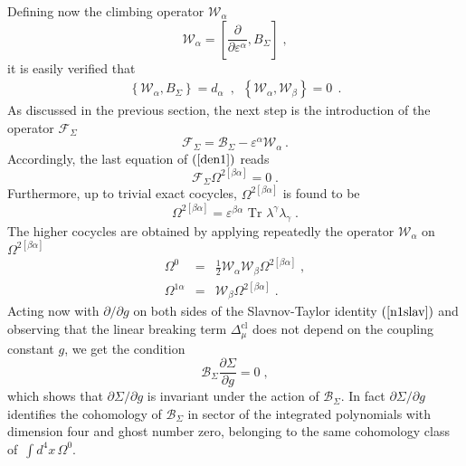 \documentclass[a4paper,12pt]{article}
\begin{document}
Defining now the climbing operator $\mathcal{W}_{\alpha }$ 
\begin{equation}
\mathcal{W}_{\alpha }=\left[ \frac{\partial }{\partial \varepsilon ^{\alpha }%
},B_{\Sigma }\right] \;,  \label{con1}
\end{equation}
it is easily verified that 
\begin{eqnarray}
\left\{ \mathcal{W}_{\alpha },B_{\Sigma }\right\} = d_{\alpha }\,\,\, ,
\,\,\, \left\{ \mathcal{W}_{\alpha },\mathcal{W}_{\beta }\right\} =0\,\;%
\mathrm{.}  \label{algn1}
\end{eqnarray}
As discussed in the previous section, the next step is the introduction of
the operator $\mathcal{F}_{\Sigma }\;$%
\begin{equation}
\mathcal{F}_{\Sigma }=\mathcal{B}_{\Sigma }-\varepsilon ^{\alpha }\mathcal{W}%
_{\alpha \;}.  \label{nbn1}
\end{equation}
Accordingly, the last equation of $\left( \ref{den1}\right) $ reads 
\begin{equation}
\mathcal{F}_{\Sigma }\Omega ^{2[\beta \alpha ]}=0\;.  \label{le}
\end{equation}
Furthermore, up to trivial exact cocycles, $\Omega ^{2[\beta \alpha ]}$ is
found to be 
\begin{equation}
\Omega ^{2[\beta \alpha ]}=\varepsilon ^{\beta \alpha }\,\,\mathrm{Tr\,\,}%
\lambda ^{\gamma }\lambda _{\gamma }\;.  \label{botn1}
\end{equation}
The higher cocycles are obtained by applying repeatedly the operator $%
\mathcal{W}_{\alpha }$ on $\Omega ^{2[\beta \alpha ]}$ 
\begin{eqnarray}
\Omega ^{0} &=&\frac{1}{2}\mathcal{W}_{\alpha }\mathcal{W}_{\beta }\Omega
^{2[\beta \alpha ]}\;,  \nonumber \\
\Omega ^{1\alpha } &=&\mathcal{W}_{\beta }\Omega ^{2[\beta \alpha ]}\;.
\label{soln1}
\end{eqnarray}
Acting now with $\partial /\partial g$ on both sides of the Slavnov-Taylor
identity $\left( \ref{n1slav}\right) $ and observing that the linear
breaking term $\Delta _{\mu }^{\mathrm{cl}}$ does not depend on the coupling
constant $g$, we get the condition 
\begin{equation}
\mathcal{B}_{\Sigma }\frac{\partial \Sigma }{\partial g}=0\;,  \label{n2cond}
\end{equation}
which shows that $\partial \Sigma /\partial g$ is invariant under the action
of $\mathcal{B}_{\Sigma }$. In fact $\partial \Sigma /\partial g$ identifies
the cohomology of $\mathcal{B}_{\Sigma }$ in sector of the integrated
polynomials with dimension four and ghost number zero, belonging to the same
cohomology class of $\,\int d^{4}x\,\Omega ^{0}.$
\end{document}

